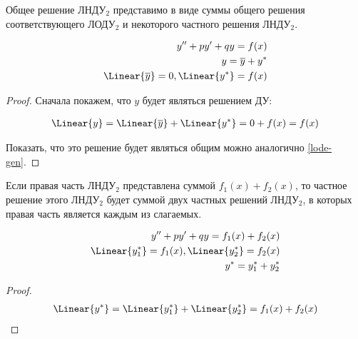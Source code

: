 
\begin{theorem}
  Общее решение ЛНДУ\(_2\) представимо в виде суммы общего решения
  соответствующего ЛОДУ\(_2\) и некоторого частного решения ЛНДУ\(_2\).

  \begin{align*}
    y'' + p y' + q y = f(x) \\
    y = \overline{y} + y^{*} \\
    \Linear{\overline{y}} = 0, \Linear{y^{*}} = f(x)
  \end{align*}
\end{theorem}
\begin{proof}
  Сначала покажем, что \(y\) будет являться решением ДУ:

  \begin{align*}
    \Linear{y} = \Linear{\overline{y}} + \Linear{y^{*}} = 0 + f(x) = f(x)
  \end{align*}

  Показать, что это решение будет являться общим можно аналогично
  \ref{lode-gen}.
\end{proof}

\begin{lemma}
  Если правая часть ЛНДУ\(_2\) представлена суммой \(f_{1}(x) + f_{2}(x)\), то
  частное решение этого ЛНДУ\(_2\) будет суммой двух частных решений ЛНДУ\(_2\),
  в которых правая часть является каждым из слагаемых.

  \begin{align*}
    y'' + p y' + q y = f_{1}(x) + f_{2}(x) \\
    \Linear{y^{*}_{1}} = f_{1}(x), \Linear{y^{*}_{2}} = f_{2}(x) \\
    y^{*} = y^{*}_{1} + y^{*}_{2}
  \end{align*}
\end{lemma}
\begin{proof}
  \begin{align*}
    \Linear{y^{*}}
    = \Linear{y^{*}_{1}} + \Linear{y^{*}_{2}}
    = f_{1}(x) + f_{2}(x)
  \end{align*}
\end{proof}
